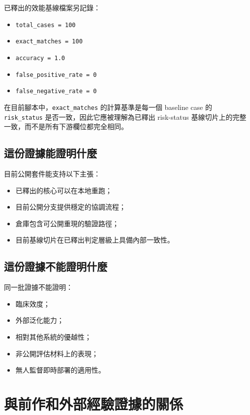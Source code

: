 \documentclass[11pt,a4paper]{article}
\begin{document}
已釋出的效能基線檔案另記錄：

\begin{itemize}[leftmargin=1.8em]
\item \texttt{total\_cases = 100}
\item \texttt{exact\_matches = 100}
\item \texttt{accuracy = 1.0}
\item \texttt{false\_positive\_rate = 0}
\item \texttt{false\_negative\_rate = 0}
\end{itemize}

在目前腳本中，\texttt{exact\_matches} 的計算基準是每一個 baseline case 的 \texttt{risk\_status} 是否一致，因此它應被理解為已釋出 risk-status 基線切片上的完整一致，而不是所有下游欄位都完全相同。

\subsection{這份證據能證明什麼}

目前公開套件能支持以下主張：

\begin{itemize}[leftmargin=1.8em]
\item 已釋出的核心可以在本地重跑；
\item 目前公開分支提供穩定的協調流程；
\item 倉庫包含可公開重現的驗證路徑；
\item 目前基線切片在已釋出判定層級上具備內部一致性。
\end{itemize}

\subsection{這份證據不能證明什麼}

同一批證據不能證明：

\begin{itemize}[leftmargin=1.8em]
\item 臨床效度；
\item 外部泛化能力；
\item 相對其他系統的優越性；
\item 非公開評估材料上的表現；
\item 無人監督即時部署的適用性。
\end{itemize}

\section{與前作和外部經驗證據的關係}
\end{document}
